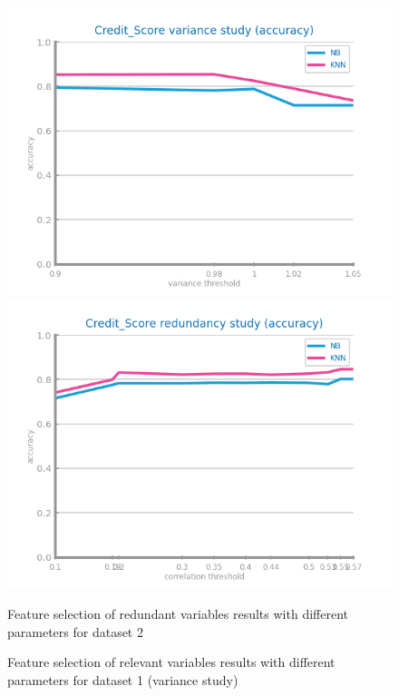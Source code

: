 \documentclass[10pt]{extarticle}
\begin{document}
\begin{figure}[H]
\centering\includegraphics[scale=0.40]{images/dataset2/data_preparation/Credit_Score_fs_low_var_accuracy_study_.png}
\includegraphics[scale=0.40]{images/dataset2/data_preparation/Credit_Score_fs_redundancy_accuracy_study.png}
\caption{Feature selection of redundant variables results with different parameters for dataset 2}
\end{figure}

\begin{figure}[H]
\caption{Feature selection of relevant variables results with different parameters for dataset 1 (variance study)} 
\end{figure}
\end{document}
